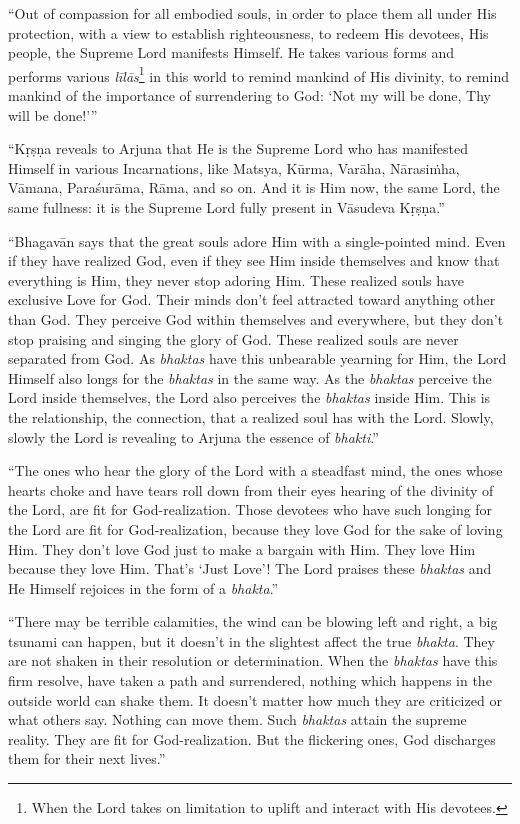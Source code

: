\enquote{Out of compassion for all embodied souls, in order to place them all under His protection, with a view to establish righteousness, to redeem His devotees, His people, the Supreme Lord manifests Himself. He takes various forms and performs various \textit{līlās}\footnote{When the Lord takes on limitation to uplift and interact with His devotees.} in this world to remind mankind of His divinity, to remind mankind of the importance of surrendering to God: \enquote{Not my will be done, Thy will be done!}}

\enquote{Kṛṣṇa reveals to Arjuna that He is the Supreme Lord who has manifested Himself in various Incarnations, like Matsya, Kūrma, Varāha, Nārasiṁha, Vāmana, Paraśurāma, Rāma, and so on. And it is Him now, the same Lord, the same fullness: it is the Supreme Lord fully present in Vāsudeva Kṛṣṇa.}

\enquote{Bhagavān says that the great souls adore Him with a single-pointed mind. Even if they have realized God, even if they see Him inside themselves and know that everything is Him, they never stop adoring Him. These realized souls have exclusive Love for God. Their minds don’t feel attracted toward anything other than God. They perceive God within themselves and everywhere, but they don’t stop praising and singing the glory of God. These realized souls are never separated from God. As \textit{bhaktas} have this unbearable yearning for Him, the Lord Himself also longs for the \textit{bhaktas} in the same way. As the \textit{bhaktas} perceive the Lord inside themselves, the Lord also perceives the \textit{bhaktas} inside Him. This is the relationship, the connection, that a realized soul has with the Lord. Slowly, slowly the Lord is revealing to Arjuna the essence of \textit{bhakti}.}

\enquote{The ones who hear the glory of the Lord with a steadfast mind, the ones whose hearts choke and have tears roll down from their eyes hearing of the divinity of the Lord, are fit for God-realization. Those devotees who have such longing for the Lord are fit for God-realization, because they love God for the sake of loving Him. They don’t love God just to make a bargain with Him. They love Him because they love Him. That’s \enquote{Just Love}! The Lord praises these \textit{bhaktas} and He Himself rejoices in the form of a \textit{bhakta}.}

\enquote{There may be terrible calamities, the wind can be blowing left and right, a big tsunami can happen, but it doesn’t in the slightest affect the true \textit{bhakta}. They are not shaken in their resolution or determination. When the \textit{bhaktas} have this firm resolve, have taken a path and surrendered, nothing which happens in the outside world can shake them. It doesn’t matter how much they are criticized or what others say. Nothing can move them. Such \textit{bhaktas} attain the supreme reality. They are fit for God-realization. But the flickering ones, God discharges them for their next lives.}

